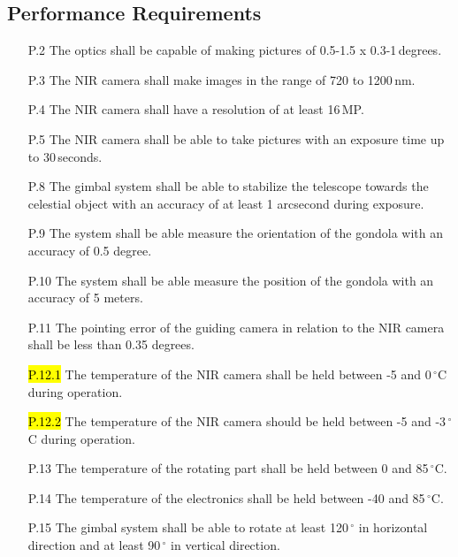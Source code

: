 \subsection{Performance Requirements}

\begin{enumerate}[topsep=0pt,itemsep=-1ex,partopsep=1ex,parsep=1ex]
    \item[P.2] The optics shall be capable of making pictures of 0.5-1.5 x 0.3-1\,degrees.
    \item[P.3] The NIR camera shall make images in the range of 720 to 1200\,nm.
    \item[P.4] The NIR camera shall have a resolution of at least 16\,MP.
    \item[P.5] The NIR camera shall be able to take pictures with an exposure time up to 30\,seconds.
    \item[P.8] The gimbal system shall be able to stabilize the telescope towards the celestial object with an accuracy of at least 1 arcsecond during exposure.
    \item[P.9] The system shall be able measure the orientation of the gondola with an accuracy of 0.5 degree.
	\item[P.10] The system shall be able measure the position of the gondola with an accuracy of 5 meters.
	\item[P.11] The pointing error of the guiding camera in relation to the NIR camera shall be less than 0.35 degrees.
	\item[\hl{P.12.1}]The temperature of the NIR camera shall be held between -5 and 0\,$^\circ$C during operation.
	\item[\hl{P.12.2}] The temperature of the NIR camera should be held between -5 and -3\,$^\circ$C during operation.
	\item[P.13] The temperature of the rotating part shall be held between 0 and 85\,$^\circ$C.
	\item[P.14] The temperature of the electronics shall be held between -40 and 85\,$^\circ$C.
	\item[P.15] The gimbal system shall be able to rotate at least 120\,$^\circ$ in horizontal direction and at least 90\,$^\circ$ in vertical direction.
\end{enumerate}
